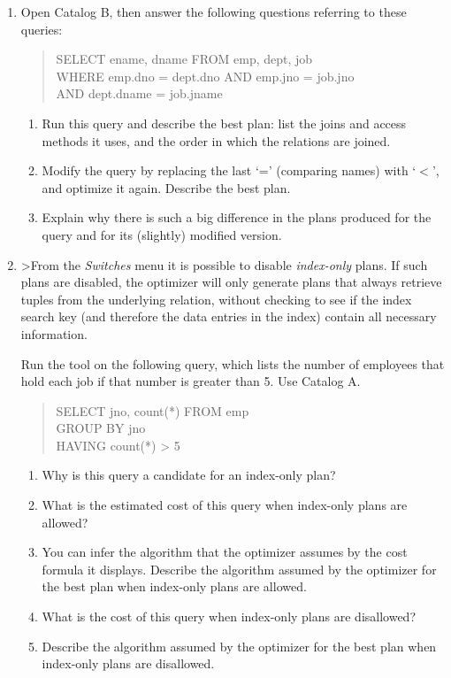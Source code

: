 \begin{enumerate}
{end eat
}


\item

Open Catalog B, then answer the following questions referring to these
queries:
\begin{quote}
     SELECT ename, dname FROM emp, dept, job\\
     WHERE emp.dno = dept.dno AND emp.jno = job.jno\\
             AND dept.dname = job.jname
\end{quote}
\begin{enumerate}
\item
Run this query and describe the best plan: list the joins and access methods
it uses, and the order in which the relations are joined.
\item
Modify the query by replacing the last `=' (comparing names) with `$<$', and
optimize it again.  Describe the best plan.
\item
Explain why there is such a big difference in the plans produced for the query
and for its (slightly) modified version.
\end{enumerate}


\item

>From the {\em Switches} menu it is possible to disable {\em index-only} plans.  
If such plans are disabled, the optimizer will only generate plans that
always retrieve tuples from the underlying relation, without checking to
see if the index search key (and therefore the data entries in the index)
contain all necessary information.

Run the tool on the following query, which lists the number of employees that
hold each job if that number is greater than 5.  Use Catalog A.
\begin{quote}
	SELECT jno, count(*) FROM emp\\
	GROUP BY jno\\
	HAVING count(*) > 5
\end{quote}

\begin{enumerate}
\item
Why is this query a candidate for an index-only plan?
\item
What is the estimated cost of this query when index-only plans are allowed?
\item
You can infer the algorithm that the optimizer assumes by the cost
formula it displays.  Describe the algorithm assumed by the optimizer for
the best plan when index-only plans are allowed.
\item
What is the cost of this query when index-only plans are disallowed?
\item
Describe the algorithm assumed by the optimizer for the best plan when
index-only plans are disallowed.
\end{enumerate}



\end{enumerate}
